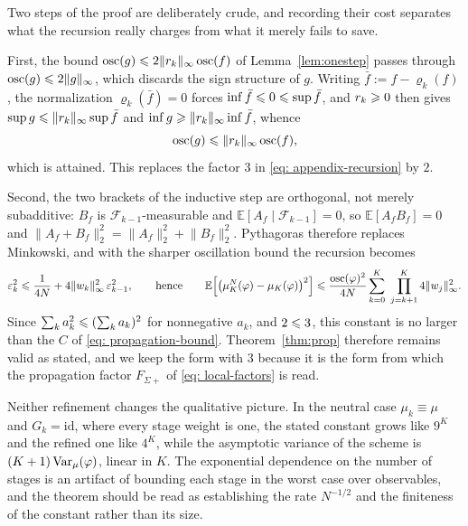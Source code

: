 \documentclass{article}
\begin{document}
{\color{red}
\begin{remark}
\label{rem:sharper}
Two steps of the proof are deliberately crude, and recording their cost separates what the recursion really charges from what it merely fails to save.

First, the bound $\operatorname{osc}(g)\leqslant2\lVert r_k\rVert_\infty\operatorname{osc}(f)$ of Lemma~\ref{lem:onestep} passes through $\operatorname{osc}(g)\leqslant2\lVert g\rVert_\infty$, which discards the sign structure of $g$. Writing $\bar f:=f-\varrho_k(f)$, the normalization $\varrho_k(\bar f)=0$ forces $\inf\bar f\leqslant0\leqslant\sup\bar f$, and $r_k\geqslant0$ then gives $\sup g\leqslant\lVert r_k\rVert_\infty\sup\bar f$ and $\inf g\geqslant\lVert r_k\rVert_\infty\inf\bar f$, whence
\begin{equation*}
    \operatorname{osc}(g)\leqslant\lVert r_k\rVert_\infty\operatorname{osc}(f),
\end{equation*}
which is attained. This replaces the factor $3$ in \eqref{eq: appendix-recursion} by $2$.

Second, the two brackets of the inductive step are orthogonal, not merely subadditive: $B_f$ is $\mathcal F_{k-1}$-measurable and $\mathbb E[A_f\mid\mathcal F_{k-1}]=0$, so $\mathbb E[A_fB_f]=0$ and $\lVert A_f+B_f\rVert_2^2=\lVert A_f\rVert_2^2+\lVert B_f\rVert_2^2$. Pythagoras therefore replaces Minkowski, and with the sharper oscillation bound the recursion becomes
\begin{equation*}
    \varepsilon_k^2 \Le \frac{1}{4N} + 4\lVert w_k\rVert_\infty^2\,\varepsilon_{k-1}^2,
    \qquad\text{hence}\qquad
    \mathbb E\Bigl[\bigl(\mu_K^N(\varphi)-\mu_K(\varphi)\bigr)^2\Bigr]
    \Le \frac{\osc(\varphi)^2}{4N}\sum_{k=0}^{K}\ \prod_{j=k+1}^{K}4\lVert w_j\rVert_\infty^2 .
\end{equation*}
Since $\sum_ka_k^2\leqslant(\sum_ka_k)^2$ for nonnegative $a_k$, and $2\leqslant3$, this constant is no larger than the $C$ of \eqref{eq: propagation-bound}. Theorem~\ref{thm:prop} therefore remains valid as stated, and we keep the form with $3$ because it is the form from which the propagation factor $F_{\Sigma+}$ of \eqref{eq: local-factors} is read.

Neither refinement changes the qualitative picture. In the neutral case $\mu_k\equiv\mu$ and $G_k=\mathrm{id}$, where every stage weight is one, the stated constant grows like $9^{K}$ and the refined one like $4^{K}$, while the asymptotic variance of the scheme is $(K+1)\operatorname{Var}_\mu(\varphi)$, linear in $K$. The exponential dependence on the number of stages is an artifact of bounding each stage in the worst case over observables, and the theorem should be read as establishing the rate $N^{-1/2}$ and the finiteness of the constant rather than its size.
\end{remark}
}
\end{document}

